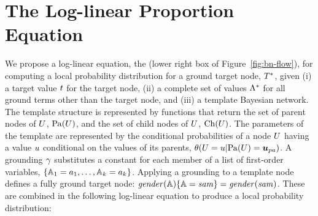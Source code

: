 \documentclass[runningheads,a4paper]{llncs}
\begin{document}
\section{The Log-linear Proportion Equation} 
\label{sec:theequation}
We propose a log-linear equation, the  (lower right box of Figure~\ref{fig:bn-flow}), for computing a local probability distribution for a ground target node, $T^{*}\hspace{0.0ex}$, given (i) a target value $t$ for the target node, (ii) a complete set of values $\Lambda^{*}\hspace{0.0ex}$  for all ground terms other than the target node, and (iii) a template Bayesian network. The template structure is represented by functions that return the set of parent nodes of $U$, $\mathrm{Pa}(U)$, and the set of child nodes of $U$, $\mathrm{Ch}(U)$. The parameters of the template are
represented by the conditional probabilities of a node $U$ having a value $u$ conditional on the values of its parents, $\cprob{\UT = \UV}{\Pa{\UT} = \Prange{\UT}}$. A grounding $\gamma$ substitutes a constant for each member of a list of first-order variables, $\{\mathbb{A}_{1} = a_{1},\ldots, \mathbb{A}_{k} = a_{k}\}$. Applying a grounding to a template node defines a fully ground target node: $\it{gender}(\mathbb{A}) \{\mathbb{A} = sam\} = \it{gender}(sam)$.  These are combined in the following log-linear equation to produce a local probability distribution:
\end{document}
